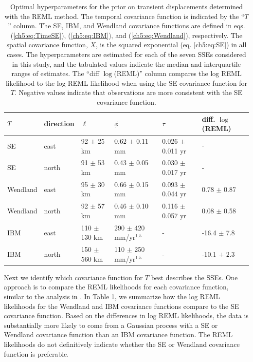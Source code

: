 \begin{table}\label{ch5:tab:Parameters}
\caption{Optimal hyperparameters for the prior on transient displacements determined with the REML method. The temporal covariance function is indicated by the ``$T$'' column. The SE, IBM, and Wendland covariance functions are defined in eqs. (\ref{ch5:eq:TimeSE}), (\ref{ch5:eq:IBM}), and (\ref{ch5:eq:Wendland}), respectively. The spatial covariance function, $X$, is the squared exponential (eq. \ref{ch5:eq:SE}) in all cases. The hyperparameters are estimated for each of the seven SSEs considered in this study, and the tabulated values indicate the median and interquartile ranges of estimates. The ``diff $\log$(REML)'' column compares the log REML likelihood to the log REML likelihood when using the SE covariance function for $T$. Negative values indicate that observations are more consistent with the SE covariance function.} 
\begin{tabular} {l l l l l l}
$T$ & direction & $\ell$  & $\phi$   & $\tau$  & diff. $\log$(REML) \\ \hline
SE & east   & 92 $\pm$ 25 km  & 0.62 $\pm$ 0.11 mm  & 0.026 $\pm$ 0.011 yr  &  - \\
SE & north  & 91 $\pm$ 53 km  & 0.43 $\pm$ 0.05 mm  & 0.030 $\pm$ 0.017 yr  &  - \\
Wendland & east   & 95 $\pm$ 30 km  & 0.66 $\pm$ 0.15 mm  & 0.093 $\pm$ 0.044 yr &  0.78 $\pm$ 0.87 \\
Wendland & north  & 92 $\pm$ 57 km  & 0.46 $\pm$ 0.10 mm  & 0.116 $\pm$ 0.057 yr &  0.08 $\pm$ 0.58 \\
IBM & east   & 110 $\pm$ 130 km & 290 $\pm$ 420 mm/yr$^{1.5}$  & -          & -16.4 $\pm$ 7.8 \\
IBM & north  & 150 $\pm$ 560 km & 110 $\pm$ 250 mm/yr$^{1.5}$ & -           & -10.1 $\pm$ 2.3 \\
\end{tabular}
\end{table}

Next we identify which covariance function for $T$ best describes the SSEs. One approach is to compare the REML likelihoods for each covariance function, similar to the analysis in \citet{Langbein2004}. In Table 1, we summarize how the log REML likelihoods for the Wendland and IBM covariance functions compare to the SE covariance function.  Based on the differences in log REML likelihoods, the data is substantially more likely to come from a Gaussian process with a SE or Wendland covariance function than an IBM covariance function. The REML likelihoods do not definitively indicate whether the SE or Wendland covariance function is preferable. 

